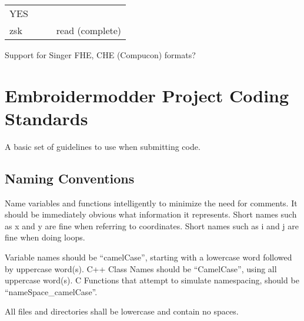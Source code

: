 \begin{longtable}[]{@{}llll@{}}
\begin{minipage}[t]{0.22\columnwidth}
YES\strut
\end{minipage} & \begin{minipage}[t]{0.25\columnwidth}\raggedright
\strut
\end{minipage} & \begin{minipage}[t]{0.22\columnwidth}\raggedright
\strut
\end{minipage}\tabularnewline
\begin{minipage}[t]{0.19\columnwidth}\raggedright
zsk\strut
\end{minipage} & \begin{minipage}[t]{0.22\columnwidth}\raggedright
\strut
\end{minipage} & \begin{minipage}[t]{0.25\columnwidth}\raggedright
\strut
\end{minipage} & \begin{minipage}[t]{0.22\columnwidth}\raggedright
read (complete)\strut
\end{minipage}\tabularnewline
\bottomrule
\end{longtable}

Support for Singer FHE, CHE (Compucon) formats?

\hypertarget{embroidermodder-project-coding-standards}{%
\section{Embroidermodder Project Coding
Standards}\label{embroidermodder-project-coding-standards}}

A basic set of guidelines to use when submitting code.

\hypertarget{naming-conventions}{%
\subsection{Naming Conventions}\label{naming-conventions}}

Name variables and functions intelligently to minimize the need for
comments. It should be immediately obvious what information it
represents. Short names such as x and y are fine when referring to
coordinates. Short names such as i and j are fine when doing loops.

Variable names should be ``camelCase'', starting with a lowercase word
followed by uppercase word(s). C++ Class Names should be ``CamelCase'',
using all uppercase word(s). C Functions that attempt to simulate
namespacing, should be ``nameSpace\_camelCase''.

All files and directories shall be lowercase and contain no spaces.


